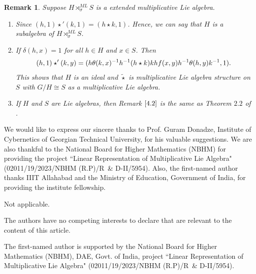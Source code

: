 \documentclass[10 pt,oneside,reqno,a4paper]{amsart}
\newtheorem{remark}[theorem]{Remark}
\numberwithin{equation}{section}
\begin{document}

\begin{remark} Suppose   $H \rtimes_{\sigma}^{ML}S$ is a extended multiplicative Lie algebra.
\begin{enumerate}
    \item Since $(h, 1) \star' (k, 1) = (h \star k, 1)$. Hence, we can say that $H$ is a subalgebra of $H \rtimes_{\sigma}^{ML}S$.     

\item If $\delta(h, x) =1$ for all $h\in H$ and $x \in S$. Then $$(h, 1) \star' (k, y) = (h \theta(k,x)^{-1}h^{-1}(h \star k)kh f(x,y) \notag h^{-1}\theta(h,y)k^{-1}, 1).$$ This shows that $H$ is an ideal and $\widetilde{\star}$ is multiplicative Lie algebra  structure on $S$ with $G/H \cong S$ as a multiplicative Lie algebra.
\item  If $H$ and $S$ are Lie algebras, then Remark $\ref{4.2}$ is the same as Theorem $2.2$ of \cite{AG}.
\end{enumerate}
\end{remark}

 We would like to express our sincere thanks to Prof. Guram Donadze, Institute of Cybernetics of Georgian Technical University, for his valuable suggestions. We are also thankful to the National Board for Higher Mathematics (NBHM) for providing the project ``Linear Representation of Multiplicative Lie Algebra" (02011/19/2023/NBHM (R.P)/R~\& D-II/5954). Also, the first-named author thanks IIIT Allahabad and the Ministry of Education, Government of India, for providing the institute fellowship.

 Not applicable.

 The authors have no competing interests to declare that are relevant to the content of this article.

 The first-named author is supported by the National Board for Higher Mathematics (NBHM), DAE, Govt. of India, project ``Linear Representation of Multiplicative Lie Algebra" (02011/19/2023/NBHM (R.P)/R~\& D-II/5954). 
\end{document}
